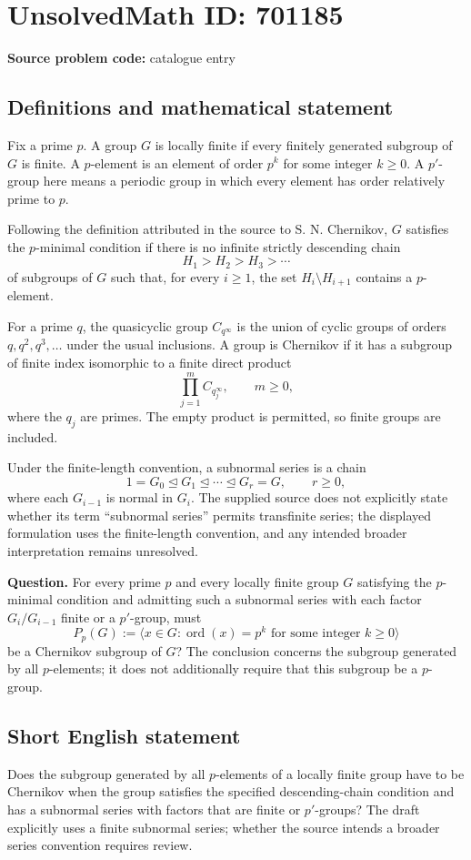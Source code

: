 \documentclass[11pt]{article}
\begin{document}
\section*{UnsolvedMath ID: 701185}
\textbf{Source problem code:} catalogue entry
\subsection{Definitions and mathematical statement}
Fix a prime \(p\). A group \(G\) is locally finite if every finitely generated subgroup of \(G\) is finite. A \(p\)-element is an element of order \(p^k\) for some integer \(k\geq 0\). A \(p'\)-group here means a periodic group in which every element has order relatively prime to \(p\).

Following the definition attributed in the source to S. N. Chernikov, \(G\) satisfies the \(p\)-minimal condition if there is no infinite strictly descending chain
\[
H_1>H_2>H_3>\cdots
\]
of subgroups of \(G\) such that, for every \(i\geq 1\), the set \(H_i\setminus H_{i+1}\) contains a \(p\)-element.

For a prime \(q\), the quasicyclic group \(C_{q^\infty}\) is the union of cyclic groups of orders \(q,q^2,q^3,\ldots\) under the usual inclusions. A group is Chernikov if it has a subgroup of finite index isomorphic to a finite direct product
\[
\prod_{j=1}^{m} C_{q_j^\infty},
\qquad m\geq 0,
\]
where the \(q_j\) are primes. The empty product is permitted, so finite groups are included.

Under the finite-length convention, a subnormal series is a chain
\[
1=G_0\trianglelefteq G_1\trianglelefteq\cdots\trianglelefteq G_r=G,
\qquad r\geq 0,
\]
where each \(G_{i-1}\) is normal in \(G_i\). The supplied source does not explicitly state whether its term ``subnormal series'' permits transfinite series; the displayed formulation uses the finite-length convention, and any intended broader interpretation remains unresolved.

\textbf{Question.} For every prime \(p\) and every locally finite group \(G\) satisfying the \(p\)-minimal condition and admitting such a subnormal series with each factor \(G_i/G_{i-1}\) finite or a \(p'\)-group, must
\[
P_p(G):=\bigl\langle x\in G:\operatorname{ord}(x)=p^k\text{ for some integer }k\geq 0\bigr\rangle
\]
be a Chernikov subgroup of \(G\)? The conclusion concerns the subgroup generated by all \(p\)-elements; it does not additionally require that this subgroup be a \(p\)-group.
\subsection{Short English statement}
Does the subgroup generated by all \(p\)-elements of a locally finite group have to be Chernikov when the group satisfies the specified descending-chain condition and has a subnormal series with factors that are finite or \(p'\)-groups? The draft explicitly uses a finite subnormal series; whether the source intends a broader series convention requires review.
\end{document}
